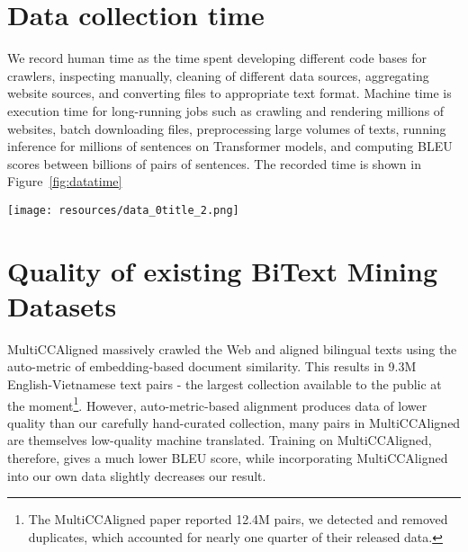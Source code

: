 \documentclass[11pt]{article}
\begin{document}
\section{Data collection time}

We record human time as the time spent developing different code bases for crawlers, inspecting manually, cleaning of different data sources, aggregating website sources, and converting files to appropriate text format. Machine time is execution time for long-running jobs such as crawling and rendering millions of websites, batch downloading files, preprocessing large volumes of texts, running inference for millions of sentences on Transformer models, and computing BLEU scores between billions of pairs of sentences. The recorded time is shown in Figure~\ref{fig:datatime}

\begin{figure*}[ht!]
    \centering
    \texttt{[image: resources/data\_0title\_2.png]}
    \caption{Time required to 4.2M bitexts, color-coded for four tiers of data sources (1) combine existing open-sourced corpora, (2) score and filter noisy sources, (3) DP alignment from weakly-aligned documents, and (4) manual crawl and clean. With comparable outputs, the time invested is vastly different between them. The most expensive approach is manual crawl and clean, while the most scalable is DP alignment.}
    \label{fig:datatime}
\end{figure*}

\section{Quality of existing BiText Mining Datasets}
\label{app:ccalign}
MultiCCAligned \cite{elkishky_ccaligned_2020} massively crawled the Web and aligned bilingual texts using the auto-metric of embedding-based document similarity. This results in 9.3M English-Vietnamese text pairs - the largest collection available to the public at the moment\footnote{The MultiCCAligned paper reported 12.4M pairs, we detected and removed duplicates, which accounted for nearly one quarter of their released data.}. However, auto-metric-based alignment produces data of lower quality than our carefully hand-curated collection, many pairs in MultiCCAligned are themselves low-quality machine translated. Training on MultiCCAligned, therefore, gives a much lower BLEU score, while incorporating MultiCCAligned into our own data slightly decreases our result.
\end{document}
